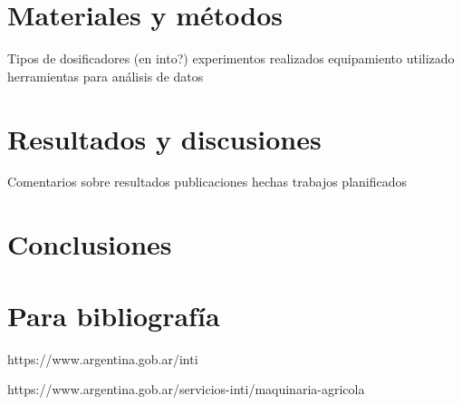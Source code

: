 \documentclass[12pt]{article}
\begin{document}
    
    
    \section{Materiales y métodos}

    Tipos de dosificadores (en into?) 
    experimentos realizados
    equipamiento utilizado
    herramientas para análisis de datos    
    
    
    \section{Resultados y discusiones}
    
    Comentarios sobre resultados
    publicaciones hechas
    trabajos planificados
    
    
	\section{Conclusiones}
	
	\section{Para bibliografía}
	
	https://www.argentina.gob.ar/inti
	
    https://www.argentina.gob.ar/servicios-inti/maquinaria-agricola
    
\end{document}

